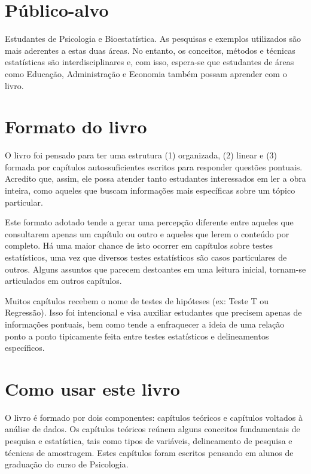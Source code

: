 \documentclass[
]{book}
\begin{document}
\hypertarget{puxfablico-alvo}{%
\section{Público-alvo}\label{puxfablico-alvo}}

Estudantes de Psicologia e Bioestatística. As pesquisas e exemplos utilizados são mais aderentes a estas duas áreas. No entanto, os conceitos, métodos e técnicas estatísticas são interdisciplinares e, com isso, espera-se que estudantes de áreas como Educação, Administração e Economia também possam aprender com o livro.

\hypertarget{formato-do-livro}{%
\section{Formato do livro}\label{formato-do-livro}}

O livro foi pensado para ter uma estrutura (1) organizada, (2) linear e (3) formada por capítulos autossuficientes escritos para responder questões pontuais. Acredito que, assim, ele possa atender tanto estudantes interessados em ler a obra inteira, como aqueles que buscam informações mais específicas sobre um tópico particular.

Este formato adotado tende a gerar uma percepção diferente entre aqueles que consultarem apenas um capítulo ou outro e aqueles que lerem o conteúdo por completo. Há uma maior chance de isto ocorrer em capítulos sobre testes estatísticos, uma vez que diversos testes estatísticos são casos particulares de outros. Alguns assuntos que parecem destoantes em uma leitura inicial, tornam-se articulados em outros capítulos.

Muitos capítulos recebem o nome de testes de hipóteses (ex: Teste T ou Regressão). Isso foi intencional e visa auxiliar estudantes que precisem apenas de informações pontuais, bem como tende a enfraquecer a ideia de uma relação ponto a ponto tipicamente feita entre testes estatísticos e delineamentos específicos.

\hypertarget{como-usar-este-livro}{%
\section{Como usar este livro}\label{como-usar-este-livro}}

O livro é formado por dois componentes: capítulos teóricos e capítulos voltados à análise de dados. Os capítulos teóricos reúnem alguns conceitos fundamentais de pesquisa e estatística, tais como tipos de variáveis, delineamento de pesquisa e técnicas de amostragem. Estes capítulos foram escritos pensando em alunos de graduação do curso de Psicologia.
\end{document}
